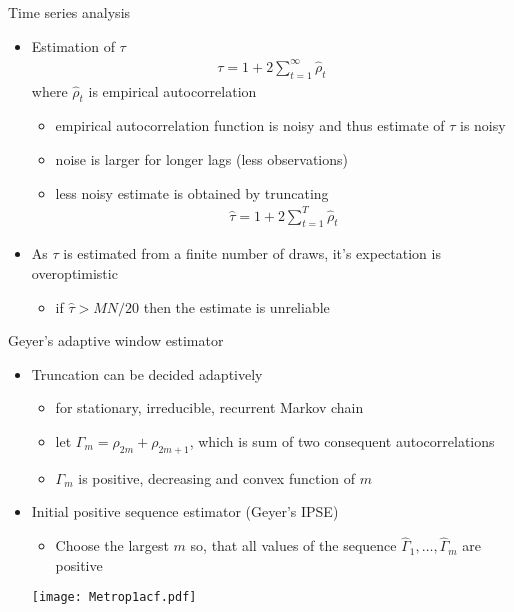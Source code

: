 \documentclass[finnish,english,t]{beamer}
\begin{document}
\begin{frame}{Time series analysis}

  \begin{itemize}
  \item Estimation of $\tau$
    \begin{align*}
      \tau = 1 + 2 \sum_{t=1}^\infty \hat{\rho}_t
    \end{align*}
    where $\hat{\rho}_t$ is empirical autocorrelation 
    \begin{itemize}
    \item<2-> empirical autocorrelation function is noisy and thus
      estimate of $\tau$ is noisy
    \item<2-> noise is larger for longer lags (less observations)
    \item<3-> less noisy estimate is obtained by truncating
    \begin{align*}
      \hat{\tau} = 1 + 2 \sum_{t=1}^T \hat{\rho}_t
    \end{align*}
    \end{itemize}
    \item<4-> As $\tau$ is estimated from a finite number of draws,
      it's expectation is overoptimistic
      \begin{itemize}
      \item if $\hat{\tau}>MN/20$ then the estimate is unreliable

      \end{itemize}
    \end{itemize}
\end{frame}

\begin{frame}{Geyer's adaptive window estimator}

  \begin{itemize}
  \item Truncation can be decided adaptively
    \begin{itemize}
    \item for stationary, irreducible, recurrent Markov chain
    \item let $\Gamma_m=\rho_{2m}+\rho_{2m+1}$, which is sum of two
      consequent autocorrelations
    \item $\Gamma_m$ is positive, decreasing and convex function of $m$
    \end{itemize}
    \vspace{0.5\baselineskip}
  \item<2-> Initial positive sequence estimator (Geyer's IPSE)
      \begin{itemize}
        \item Choose the largest $m$ so, that all values of the sequence
        $\hat{\Gamma}_1, \ldots, \hat{\Gamma}_m$ are positive
      \end{itemize}
  \vspace{0.5\baselineskip}
      \texttt{[image: Metrop1acf.pdf]}
  \end{itemize}
\end{frame}
\end{document}
